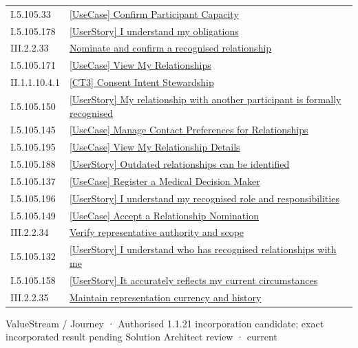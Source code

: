 \begin{longtable}{p{.22\linewidth}p{.73\linewidth}}
I.5.105.33 & \hyperref[element:d167ab090deb49ba882e551f2d080110]{[UseCase] Confirm Participant Capacity} \\
I.5.105.178 & \hyperref[element:d275deb5208840e48760367bc8edcdb1]{[UserStory] I understand my obligations} \\
III.2.2.33 & \hyperref[element:d481668c85ab429981ce97bba2fd6e9a]{Nominate and confirm a recognised relationship} \\
I.5.105.171 & \hyperref[element:d5f1a2e4e5aa4024978934fdf984de87]{[UseCase] View My Relationships} \\
II.1.1.10.4.1 & \hyperref[element:d65ed66aba2542da87a321e7eeb274b9]{[CT3] Consent Intent Stewardship} \\
I.5.105.150 & \hyperref[element:d70f4ba8847f45b6ab1e01e3d473be9f]{[UserStory] My relationship with another participant is formally recognised} \\
I.5.105.145 & \hyperref[element:dbd13829bc624a218781886dfb10db71]{[UseCase] Manage Contact Preferences for Relationships} \\
I.5.105.195 & \hyperref[element:dbfd8566dac347b0a3249a851320b43e]{[UseCase] View My Relationship Details} \\
I.5.105.188 & \hyperref[element:df0007efce7e47d8b73ef406762bb6c7]{[UserStory] Outdated relationships can be identified} \\
I.5.105.137 & \hyperref[element:e6c59a900b334eff8865c031b4116569]{[UseCase] Register a Medical Decision Maker} \\
I.5.105.196 & \hyperref[element:ed9f2ba829d4451e96eb346ea03c4fa3]{[UserStory] I understand my recognised role and responsibilities} \\
I.5.105.149 & \hyperref[element:edf72699984946abb090ae393eccda39]{[UseCase] Accept a Relationship Nomination} \\
III.2.2.34 & \hyperref[element:ee60990709724506905c5dbe8e21261a]{Verify representative authority and scope} \\
I.5.105.132 & \hyperref[element:f0b698c19c3843daa214edde62c6b5c9]{[UserStory] I understand who has recognised relationships with me} \\
I.5.105.158 & \hyperref[element:f320d6c4c0334df0aa926eda447a661a]{[UserStory] It accurately reflects my current circumstances} \\
III.2.2.35 & \hyperref[element:fa9998f53cd64832abe79b40904440f5]{Maintain representation currency and history} \\
\end{longtable}
\label{element:45372a8e0fc64dd3ba0f2cc4b14b0ee3}
{\small ValueStream / Journey · Authorised 1.1.21 incorporation candidate; exact incorporated result pending Solution Architect review · current}\par

